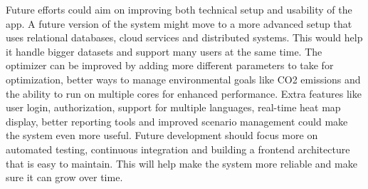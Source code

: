 Future efforts could aim on improving both technical setup and usability of the app. A future version of the system might move to a more advanced setup that uses relational databases, cloud services and distributed systems. This would help it handle bigger datasets and support many users at the same time. The optimizer can be improved by adding more different parameters to take for optimization, better ways to manage environmental goals like CO2 emissions and the ability to run on multiple cores for enhanced performance. Extra features like user login, authorization, support for multiple languages, real-time heat map display, better reporting tools and improved scenario management could make the system even more useful. Future development should focus more on automated testing, continuous integration and building a frontend architecture that is easy to maintain. This will help make the system more reliable and make sure it can grow over time.\par
